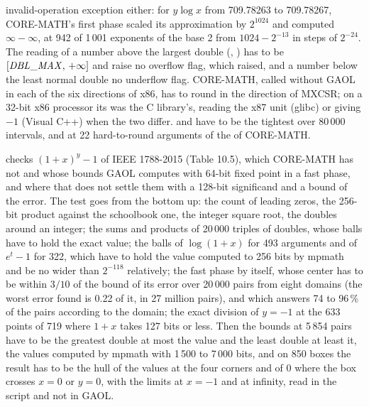 \documentclass[12pt,a4paper,twoside,openright]{book}
\begin{document}
invalid-operation exception either: for $y\log x$ from
709.78263 to 709.78267, CORE-MATH's first phase scaled its approximation by
$2^{1024}$ and computed $\infty-\infty$, at 942 of 1\,001 exponents of the
base 2 from $1024-2^{-13}$ in steps of $2^{-24}$.\newinvfive{} The reading
of a number above the largest double (, ) has to
be $[\mathit{DBL\_MAX},\,+\infty]$ and raise no overflow flag, which
 raised, and a number below the least normal double no
underflow flag.\newinvfive{} CORE-MATH, called without GAOL in each of the
six directions of x86, has to round in the direction of MXCSR; on a 32-bit
x86 processor its  was the C library's, reading the x87
unit (glibc) or giving $-1$ (Visual C++) when the two differ. 
and  have to be the tightest over 80\,000 intervals, and at 22
hard-to-round arguments of the  of CORE-MATH.

\medskip
{} checks $(1+x)^y-1$ of IEEE 1788-2015 (Table 10.5), which
CORE-MATH has not and whose bounds GAOL computes with 64-bit fixed point in
a fast phase, and where that does not settle them with a 128-bit
significand and a bound of the error.\newinvfive{} The test goes from the
bottom up: the count of leading zeros, the 256-bit product against the
schoolbook one, the integer square root, the doubles around an integer; the
sums and products of 20\,000 triples of doubles, whose balls have to hold
the exact value; the balls of $\log(1+x)$ for 493 arguments and of $e^t-1$
for 322, which have to hold the value computed to 256 bits by mpmath and be
no wider than $2^{-118}$ relatively; the fast phase by itself, whose center
has to be within $3/10$ of the bound of its error over 20\,000 pairs from
eight domains (the worst error found is 0.22 of it, in 27 million pairs),
and which answers 74 to 96\,\% of the pairs according to the domain; the
exact division of $y=-1$ at the 633 points of 719 where $1+x$ takes 127 bits
or less. Then the bounds at 5\,854 pairs have to be the greatest double at
most the value and the least double at least it, the values computed by
mpmath with 1\,500 to 7\,000 bits, and on 850 boxes the result has to be
the hull of the values at the four corners and of 0 where the box crosses
$x=0$ or $y=0$, with the limits at $x=-1$ and at infinity, read in the
script and not in GAOL.
\end{document}
